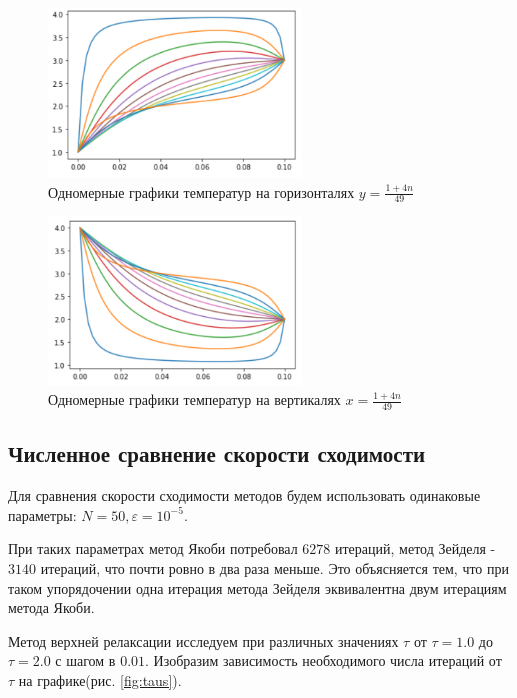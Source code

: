 \documentclass[report , a4paper, onecolumn, 12pt]{article}
\begin{document}
\begin{figure}[]
    \centering
    \includegraphics[width=0.6\textwidth]{profiles_h}
    \caption{Одномерные графики температур на горизонталях $y=\frac{1+4n}{49}$}
    \label{fig:profiles_h}
\end{figure}

\begin{figure}[]
    \centering
    \includegraphics[width=0.6\textwidth]{profiles_v}
    \caption{Одномерные графики температур на вертикалях $x=\frac{1+4n}{49}$}
    \label{fig:profiles_v}
\end{figure}

\subsection{Численное сравнение скорости сходимости}

Для сравнения скорости сходимости методов будем использовать одинаковые параметры: $N = 50, \varepsilon = 10^{-5}$.

При таких параметрах метод Якоби потребовал $6278$ итераций, метод Зейделя - $3140$ итераций, что почти ровно в два раза меньше. Это объясняется тем, что при таком упорядочении одна итерация метода Зейделя эквивалентна двум итерациям метода Якоби. 

Метод верхней релаксации исследуем при различных значениях $\tau$ от $\tau = 1.0$ до $\tau = 2.0$ с шагом в $0.01$. Изобразим зависимость необходимого числа итераций от $\tau$ на графике(рис. \ref{fig:taus}).
\end{document}
